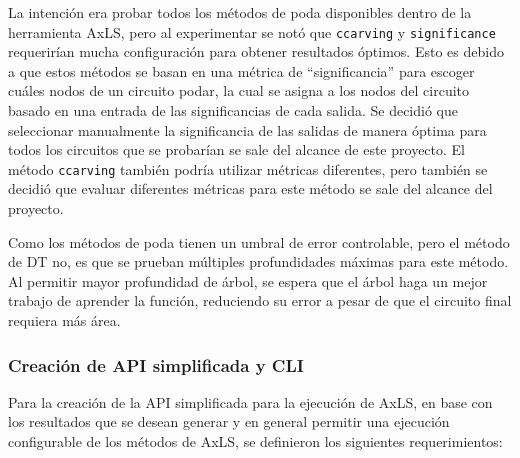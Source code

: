 La intención era probar todos los métodos de poda disponibles dentro de la
herramienta AxLS, pero al experimentar se notó que \texttt{ccarving} y
\texttt{significance} requerirían mucha configuración para obtener resultados
óptimos. Esto es debido a que estos métodos se basan en una métrica de
``significancia'' para escoger cuáles nodos de un circuito podar, la cual se
asigna a los nodos del circuito basado en una entrada de las significancias de
cada salida. Se decidió que seleccionar manualmente la significancia de las
salidas de manera óptima para todos los circuitos que se probarían se sale del
alcance de este proyecto. El método \texttt{ccarving} también podría utilizar
métricas diferentes, pero también se decidió que evaluar diferentes métricas
para este método se sale del alcance del proyecto.

Como los métodos de poda tienen un umbral de error controlable, pero el método
de DT no, es que se prueban múltiples profundidades máximas para este método.
Al permitir mayor profundidad de árbol, se espera que el árbol haga un mejor
trabajo de aprender la función, reduciendo su error a pesar de que el circuito
final requiera más área.

\subsubsection{Creación de API simplificada y CLI}

Para la creación de la API simplificada para la ejecución de AxLS, en base con
los resultados que se desean generar y en general permitir una ejecución
configurable de los métodos de AxLS, se definieron los siguientes
requerimientos:

